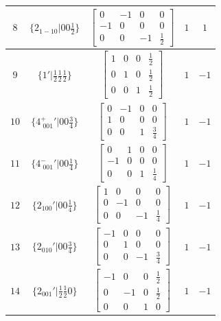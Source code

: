 \documentclass[fleqn,8pt]{jsarticle}
\begin{document}
\begin{longtable}{ccccc}
$ 8 $ & $ \{2{}_{1-10}|0 0 \frac{1}{2}\} $ & $ \begin{bmatrix} 0 & -1 & 0 & 0 \\ -1 & 0 & 0 & 0 \\ 0 & 0 & -1 & \frac{1}{2} \end{bmatrix} $ & $ 1 $ & $ 1 $ \\ \hline
$ 9 $ & $ \{1{}'|\frac{1}{2} \frac{1}{2} \frac{1}{2}\} $ & $ \begin{bmatrix} 1 & 0 & 0 & \frac{1}{2} \\ 0 & 1 & 0 & \frac{1}{2} \\ 0 & 0 & 1 & \frac{1}{2} \end{bmatrix} $ & $ 1 $ & $ -1 $ \\ \hline
$ 10 $ & $ \{4^{+}_{\,\,001}{}'|0 0 \frac{3}{4}\} $ & $ \begin{bmatrix} 0 & -1 & 0 & 0 \\ 1 & 0 & 0 & 0 \\ 0 & 0 & 1 & \frac{3}{4} \end{bmatrix} $ & $ 1 $ & $ -1 $ \\ \hline
$ 11 $ & $ \{4^{-}_{\,\,001}{}'|0 0 \frac{1}{4}\} $ & $ \begin{bmatrix} 0 & 1 & 0 & 0 \\ -1 & 0 & 0 & 0 \\ 0 & 0 & 1 & \frac{1}{4} \end{bmatrix} $ & $ 1 $ & $ -1 $ \\ \hline
$ 12 $ & $ \{2{}_{100}{}'|0 0 \frac{1}{4}\} $ & $ \begin{bmatrix} 1 & 0 & 0 & 0 \\ 0 & -1 & 0 & 0 \\ 0 & 0 & -1 & \frac{1}{4} \end{bmatrix} $ & $ 1 $ & $ -1 $ \\ \hline
$ 13 $ & $ \{2{}_{010}{}'|0 0 \frac{3}{4}\} $ & $ \begin{bmatrix} -1 & 0 & 0 & 0 \\ 0 & 1 & 0 & 0 \\ 0 & 0 & -1 & \frac{3}{4} \end{bmatrix} $ & $ 1 $ & $ -1 $ \\ \hline
$ 14 $ & $ \{2{}_{001}{}'|\frac{1}{2} \frac{1}{2} 0\} $ & $ \begin{bmatrix} -1 & 0 & 0 & \frac{1}{2} \\ 0 & -1 & 0 & \frac{1}{2} \\ 0 & 0 & 1 & 0 \end{bmatrix} $ & $ 1 $ & $ -1 $ \\ \hline

\end{longtable}
\end{document}
